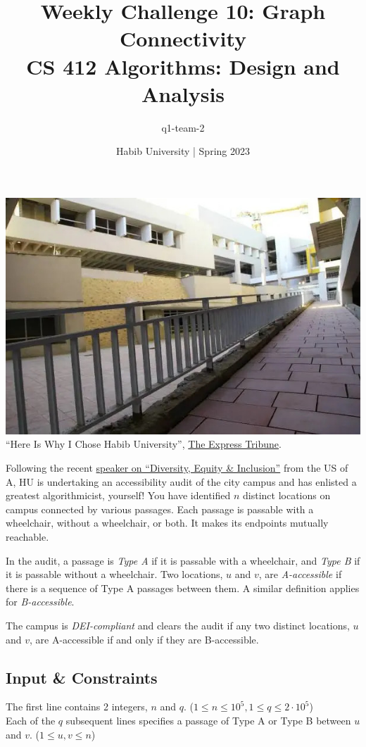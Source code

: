 \documentclass[a4paper]{exam}
\title{Weekly Challenge 10: Graph Connectivity\\CS 412 Algorithms: Design and Analysis}
\author{q1-team-2}  %
\date{Habib University | Spring 2023}
\begin{document}
\maketitle

\begin{questions}




  \begin{center}
    \includegraphics[width=.7\textwidth]{ramp}\\
    \small ``Here Is Why I Chose Habib University'', \href{https://tribune.com.pk/article/22246/here-is-why-i-chose-habib-university}{The Express Tribune}.
  \end{center}

  Following the recent \href{https://www.facebook.com/karachi.usconsulate/posts/pfbid0sb9UC6H9KPnS7fmHSpNQiHQrzXDAFhRKwWRiLD7tjDwQpyuUQKrm6vXfYH2xYUG9l}{speaker on ``Diversity, Equity \& Inclusion''} from the US of A, HU is undertaking an accessibility audit of the city campus and has enlisted a greatest algorithmicist, yourself! You have identified $n$ distinct locations on campus connected by various passages. Each passage is passable with a wheelchair, without a wheelchair, or both. It makes its endpoints mutually reachable.

  In the audit, a passage is \textit{Type A} if it is passable with a wheelchair, and \textit{Type B} if it is passable without a wheelchair. Two locations, $u$ and $v$, are \textit{A-accessible} if there is a sequence of Type A passages between them. A similar definition applies for \textit{B-accessible}.

  The campus is \textit{DEI-compliant} and clears the audit if any two distinct locations, $u$ and $v$, are A-accessible if and only if they are B-accessible.

  \subsection*{Input \& Constraints}
  The first line contains 2 integers, $n$ and $q$. ($1\leq n \leq 10^5, 1\leq q \leq 2\cdot 10^5$)
  \\
  Each of the $q$ subsequent lines specifies a passage of Type A or Type B between $u$ and $v$. ($1\leq u,v \leq n$)


\end{questions}
\end{document}
